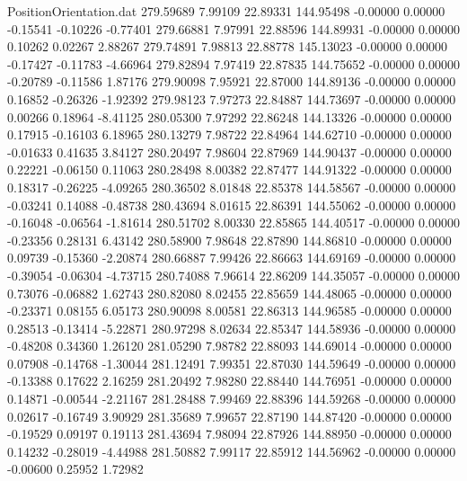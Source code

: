\begin{filecontents}{PositionOrientation.dat}
 279.59689    7.99109   22.89331   144.95498   -0.00000    0.00000   -0.15541   -0.10226   -0.77401
 279.66881    7.97991   22.88596   144.89931   -0.00000    0.00000    0.10262    0.02267    2.88267
 279.74891    7.98813   22.88778   145.13023   -0.00000    0.00000   -0.17427   -0.11783   -4.66964
 279.82894    7.97419   22.87835   144.75652   -0.00000    0.00000   -0.20789   -0.11586    1.87176
 279.90098    7.95921   22.87000   144.89136   -0.00000    0.00000    0.16852   -0.26326   -1.92392
 279.98123    7.97273   22.84887   144.73697   -0.00000    0.00000    0.00266    0.18964   -8.41125
 280.05300    7.97292   22.86248   144.13326   -0.00000    0.00000    0.17915   -0.16103    6.18965
 280.13279    7.98722   22.84964   144.62710   -0.00000    0.00000   -0.01633    0.41635    3.84127
 280.20497    7.98604   22.87969   144.90437   -0.00000    0.00000    0.22221   -0.06150    0.11063
 280.28498    8.00382   22.87477   144.91322   -0.00000    0.00000    0.18317   -0.26225   -4.09265
 280.36502    8.01848   22.85378   144.58567   -0.00000    0.00000   -0.03241    0.14088   -0.48738
 280.43694    8.01615   22.86391   144.55062   -0.00000    0.00000   -0.16048   -0.06564   -1.81614
 280.51702    8.00330   22.85865   144.40517   -0.00000    0.00000   -0.23356    0.28131    6.43142
 280.58900    7.98648   22.87890   144.86810   -0.00000    0.00000    0.09739   -0.15360   -2.20874
 280.66887    7.99426   22.86663   144.69169   -0.00000    0.00000   -0.39054   -0.06304   -4.73715
 280.74088    7.96614   22.86209   144.35057   -0.00000    0.00000    0.73076   -0.06882    1.62743
 280.82080    8.02455   22.85659   144.48065   -0.00000    0.00000   -0.23371    0.08155    6.05173
 280.90098    8.00581   22.86313   144.96585   -0.00000    0.00000    0.28513   -0.13414   -5.22871
 280.97298    8.02634   22.85347   144.58936   -0.00000    0.00000   -0.48208    0.34360    1.26120
 281.05290    7.98782   22.88093   144.69014   -0.00000    0.00000    0.07908   -0.14768   -1.30044
 281.12491    7.99351   22.87030   144.59649   -0.00000    0.00000   -0.13388    0.17622    2.16259
 281.20492    7.98280   22.88440   144.76951   -0.00000    0.00000    0.14871   -0.00544   -2.21167
 281.28488    7.99469   22.88396   144.59268   -0.00000    0.00000    0.02617   -0.16749    3.90929
 281.35689    7.99657   22.87190   144.87420   -0.00000    0.00000   -0.19529    0.09197    0.19113
 281.43694    7.98094   22.87926   144.88950   -0.00000    0.00000    0.14232   -0.28019   -4.44988
 281.50882    7.99117   22.85912   144.56962   -0.00000    0.00000   -0.00600    0.25952    1.72982

\end{filecontents}
